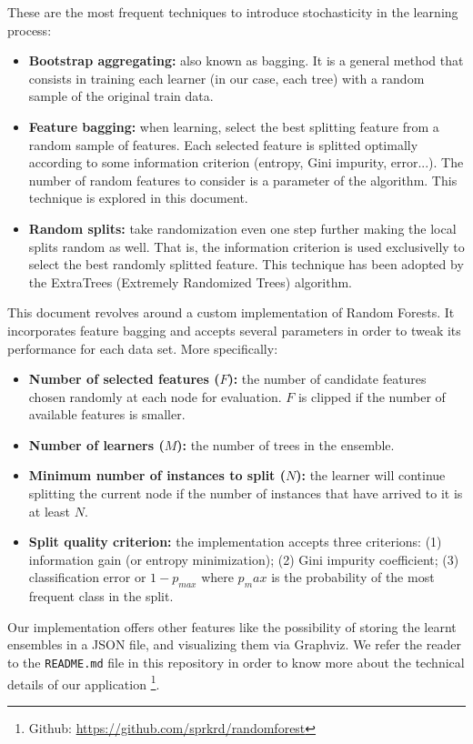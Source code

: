\documentclass[journal, a4paper]{IEEEtran}
\begin{document}
	These are the most frequent techniques to introduce stochasticity in the
	learning process:
	\begin{itemize}
		\item \textbf{Bootstrap aggregating:} also known as bagging. It is
		a general method that consists
		in training each learner (in our case, each tree) with a
		random sample of the original train data.
		\item \textbf{Feature bagging:} when learning, select the best
		splitting feature from a random sample of features. Each
		selected feature is splitted optimally according to some
		information criterion (entropy, Gini impurity, error...). The number
		of random features to consider is a parameter of the algorithm.
		This technique is explored in this document.
		\item \textbf{Random splits:} take randomization even one step
		further making the local splits random as well. That is, the
		information criterion is used exclusivelly to select the best
		randomly splitted feature. This technique has been adopted by
		the ExtraTrees (Extremely Randomized Trees) algorithm.
	\end{itemize}
	
	This document revolves around a custom implementation of Random Forests.
	It incorporates feature bagging and accepts several parameters in order
	to tweak its performance for each data set. More specifically:
	\begin{itemize}
		\item \textbf{Number of selected features ($F$):} the number of candidate
		features chosen randomly at each node for evaluation. $F$ is
		clipped if the number of available features is smaller.
		\item \textbf{Number of learners ($M$):} the number of trees in the
		ensemble.
		\item \textbf{Minimum number of instances to split ($N$):} the learner will
		continue splitting the current node if the number of instances that
		have arrived to it is at least $N$.
		\item \textbf{Split quality criterion:} the implementation
		accepts three criterions: (1) information
		gain (or entropy minimization); (2) Gini impurity coefficient; (3) 
		classification error or $ 1 - p_{max} $ where $ p_max $ is the probability
		of the most frequent class in the split.
	\end{itemize}
	
	Our implementation offers other features like the possibility of storing
	the learnt ensembles in a JSON file, and visualizing them via Graphviz.
	We refer the reader to the \texttt{README.md} file in this repository
	in order to know more about the technical details of our application
	\footnote{Github: \url{https://github.com/sprkrd/randomforest}}.
	
\end{document}
